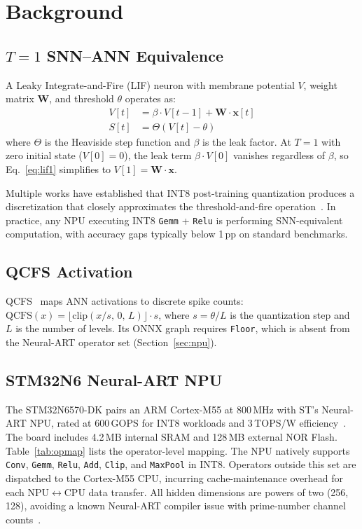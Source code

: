 \documentclass[10pt,twocolumn]{article}
\begin{document}
\section{Background}
\label{sec:background}

\subsection{\texorpdfstring{$T{=}1$}{T=1} SNN--ANN Equivalence}

A Leaky Integrate-and-Fire (LIF) neuron with membrane potential $V$,
weight matrix $\mathbf{W}$, and threshold $\theta$ operates as:
%
\begin{align}
  V[t] &= \beta \cdot V[t{-}1] + \mathbf{W} \cdot \mathbf{x}[t] \label{eq:lif1}\\
  S[t] &= \Theta(V[t] - \theta) \label{eq:lif2}
\end{align}
%
where $\Theta$ is the Heaviside step function and $\beta$ is the leak factor.
At $T{=}1$ with zero initial state ($V[0]=0$), the leak term
$\beta \cdot V[0]$ vanishes regardless of $\beta$, so
Eq.~\ref{eq:lif1} simplifies to $V[1] = \mathbf{W} \cdot \mathbf{x}$.

Multiple works have established that INT8 post-training quantization
produces a discretization that closely approximates the threshold-and-fire
operation~\cite{bu2022optimal, jiang2023unified, bu2025inference}.
In practice, any NPU executing INT8 \texttt{Gemm} + \texttt{Relu}
is performing SNN-equivalent computation, with accuracy gaps typically
below 1\,pp on standard benchmarks.

\subsection{QCFS Activation}

QCFS~\cite{bu2022optimal} maps ANN activations to discrete spike counts:
$\text{QCFS}(x) = \lfloor \text{clip}(x/s,\, 0,\, L) \rfloor \cdot s$,
where $s{=}\theta/L$ is the quantization step and $L$ is the number of
levels. Its ONNX graph requires \texttt{Floor}, which is absent from
the Neural-ART operator set (Section~\ref{sec:npu}).

\subsection{STM32N6 Neural-ART NPU}

The STM32N6570-DK pairs an ARM Cortex-M55 at 800\,MHz with ST's Neural-ART
NPU, rated at 600\,GOPS for INT8 workloads and 3\,TOPS/W
efficiency~\cite{st_neural_art}.
The board includes 4.2\,MB internal SRAM and 128\,MB external NOR Flash.
Table~\ref{tab:opmap} lists the operator-level mapping.
The NPU natively supports \texttt{Conv}, \texttt{Gemm}, \texttt{Relu},
\texttt{Add}, \texttt{Clip}, and \texttt{MaxPool} in INT8.
Operators outside this set are dispatched to the Cortex-M55 CPU,
incurring cache-maintenance overhead for each
NPU$\leftrightarrow$CPU data transfer.
All hidden dimensions are powers of two (256, 128), avoiding a known
Neural-ART compiler issue with prime-number channel
counts~\cite{st_neural_art}.
\end{document}
